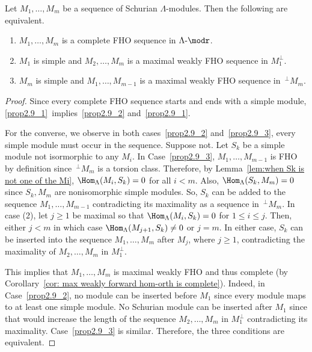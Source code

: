 \begin{prop}\label{prop: complete iff M1 is simple and M2, etc is maximal}
Let $M_1,\ldots,M_m$ be a sequence of Schurian $\Lambda$-modules. Then the following are equivalent.
\begin{enumerate}[(1)]
\item\label{prop2.9_1} $M_1,\ldots,M_m$ is a complete FHO sequence in $\Lambda\text{-}\modr $.

\item\label{prop2.9_2} $M_1$ is simple and $M_2,\ldots,M_m$ is a maximal weakly FHO sequence in $M_1^\perp$.

\item\label{prop2.9_3} $M_m$ is simple and $M_1,\ldots,M_{m-1}$ is a maximal weakly FHO sequence in $\,^\perp M_m$.
\end{enumerate}
\end{prop}

\begin{proof} Since every complete FHO sequence starts and ends with a simple module, \ref{prop2.9_1}~implies~\ref{prop2.9_2} and~\ref{prop2.9_1}.

For the converse, we observe in both cases~\ref{prop2.9_2} and~\ref{prop2.9_3}, every simple module must occur in the sequence. Suppose not. Let $S_k$ be a simple module not isormorphic to any $M_i$. In Case~\ref{prop2.9_3}, $M_1,\ldots,M_{m-1}$ is FHO by definition since $\,^\perp M_m$ is a torsion class. Therefore, by Lemma~\ref{lem:when Sk is not one of the Mi}, $\Hom_\Lambda(M_i,S_k)=0$ for all $i<m$. Also, $\Hom_\Lambda(S_k,M_m)=0$ since $S_k,M_m$ are nonisomorphic simple modules. So, $S_k$ can be added to the sequence $M_1,\ldots,M_{m-1}$ contradicting its maximality as a sequence in $\,^\perp M_m$. In case (2), let $j\ge1$ be maximal so that $\Hom_\Lambda(M_i,S_k)=0$ for $1\le i\le j$. Then, either $j<m$ in which case $\Hom_\Lambda(M_{j+1},S_k)\neq0$ or $j=m$. In either case, $S_k$ can be inserted into the sequence $M_1,\ldots,M_m$ after $M_j$, where $j\ge1$, contradicting the maximality of $M_2,\ldots,M_m$ in $M_1^\perp$. 

This implies that $M_1,\ldots,M_m$ is maximal weakly FHO and thus complete (by Corollary~\ref{cor: max weakly forward hom-orth is complete}). Indeed, in Case~\ref{prop2.9_2}, no module can be inserted before $M_1$ since every module maps to at least one simple module. No Schurian module can be inserted after $M_1$ since that would increase the length of the sequence $M_2,\ldots,M_m$ in $M_1^\perp$ contradicting its maximality. Case~\ref{prop2.9_3} is similar. Therefore, the three conditions are equivalent.
\end{proof}


